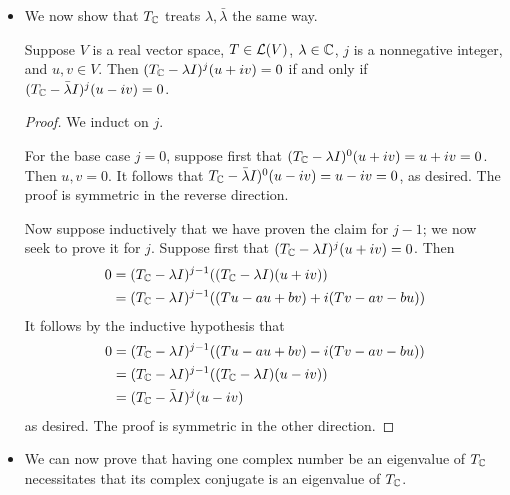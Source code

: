 \documentclass[../main.tex]{subfiles}
\begin{document}
\begin{itemize}
\begin{theorem}
\begin{proof}[Proof\footnote{\textcite{bib:Axler} also offers a more straightforward proof using the typical definition of eigenvalues and eigenvectors.}]
\begin{align*}
                &\Longleftrightarrow \lambda\text{ is a zero of }p(T)\tag*{Theorem \ref{trm:minPolyTcT}}\\
                &\Longleftrightarrow \lambda\text{ is an eigenvalue of }T\tag*{Theorem \ref{trm:minPolyZeroes}}
            \end{align*}
            as desired.
        \end{proof}
    \end{theorem}
    \item We now show that $T_{\mathbb{C}}$ treats $\lambda,\bar{\lambda}$ the same way.
    \begin{theorem}\label{trm:genEigenvalueConjugate}
        Suppose $V$ is a real vector space, $T\in\mathcal{L}(V)$, $\lambda\in\mathbb{C}$, $j$ is a nonnegative integer, and $u,v\in V$. Then $(T_{\mathbb{C}}-\lambda I)^j(u+iv)=0$ if and only if $(T_{\mathbb{C}}-\bar{\lambda}I)^j(u-iv)=0$.
        \begin{proof}
            We induct on $j$.\par
            For the base case $j=0$, suppose first that $(T_{\mathbb{C}}-\lambda I)^0(u+iv)=u+iv=0$. Then $u,v=0$. It follows that $T_{\mathbb{C}}-\bar{\lambda}I)^0(u-iv)=u-iv=0$, as desired. The proof is symmetric in the reverse direction.\par
            Now suppose inductively that we have proven the claim for $j-1$; we now seek to prove it for $j$. Suppose first that $(T_{\mathbb{C}}-\lambda I)^j(u+iv)=0$. Then
            \begin{align*}
                0 &= (T_{\mathbb{C}}-\lambda I)^{j-1}((T_{\mathbb{C}}-\lambda I)(u+iv))\\
                &= (T_{\mathbb{C}}-\lambda I)^{j-1}((Tu-au+bv)+i(Tv-av-bu))
            \end{align*}
            It follows by the inductive hypothesis that
            \begin{align*}
                0 &= (T_{\mathbb{C}}-\lambda I)^{j-1}((Tu-au+bv)-i(Tv-av-bu))\\
                &= (T_{\mathbb{C}}-\lambda I)^{j-1}((T_{\mathbb{C}}-\lambda I)(u-iv))\\
                &= (T_{\mathbb{C}}-\bar{\lambda}I)^j(u-iv)
            \end{align*}
            as desired. The proof is symmetric in the other direction.
        \end{proof}
    \end{theorem}
    \item We can now prove that having one complex number be an eigenvalue of $T_{\mathbb{C}}$ necessitates that its complex conjugate is an eigenvalue of $T_{\mathbb{C}}$.
    \begin{theorem}\label{trm:eigenConjugate}

\end{theorem}
\end{itemize}
\end{document}
